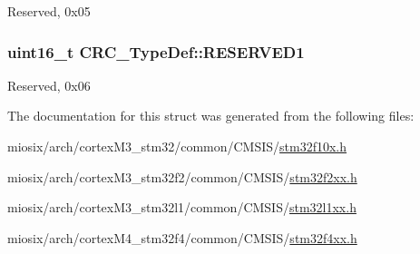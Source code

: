 Reserved, 0x05 \hypertarget{struct_c_r_c___type_def_a8b205c6e25b1808ac016db2356b3021d}{
\subsubsection[{R\-E\-S\-E\-R\-V\-E\-D1}]{\setlength{\rightskip}{0pt plus 5cm}uint16\-\_\-t C\-R\-C\-\_\-\-Type\-Def\-::\-R\-E\-S\-E\-R\-V\-E\-D1}}\label{struct_c_r_c___type_def_a8b205c6e25b1808ac016db2356b3021d}
Reserved, 0x06 

The documentation for this struct was generated from the following files\-:\begin{DoxyCompactItemize}
\item 
miosix/arch/cortex\-M3\-\_\-stm32/common/\-C\-M\-S\-I\-S/\hyperlink{stm32f10x_8h}{stm32f10x.\-h}\item 
miosix/arch/cortex\-M3\-\_\-stm32f2/common/\-C\-M\-S\-I\-S/\hyperlink{stm32f2xx_8h}{stm32f2xx.\-h}\item 
miosix/arch/cortex\-M3\-\_\-stm32l1/common/\-C\-M\-S\-I\-S/\hyperlink{stm32l1xx_8h}{stm32l1xx.\-h}\item 
miosix/arch/cortex\-M4\-\_\-stm32f4/common/\-C\-M\-S\-I\-S/\hyperlink{stm32f4xx_8h}{stm32f4xx.\-h}\end{DoxyCompactItemize}
